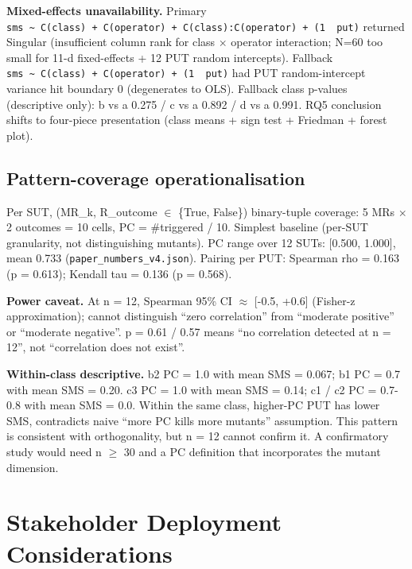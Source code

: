 \documentclass[manuscript,screen,review]{acmart}
\begin{document}
\textbf{Mixed-effects unavailability.} Primary
\texttt{sms\ \textasciitilde{}\ C(class)\ +\ C(operator)\ +\ C(class):C(operator)\ +\ (1\ \textbar{}\ put)}
returned Singular (insufficient column rank for class $\times$ operator
interaction; N=60 too small for 11-d fixed-effects + 12 PUT random
intercepts). Fallback
\texttt{sms\ \textasciitilde{}\ C(class)\ +\ C(operator)\ +\ (1\ \textbar{}\ put)}
had PUT random-intercept variance hit boundary 0 (degenerates to OLS).
Fallback class p-values (descriptive only): b vs a 0.275 / c vs a 0.892
/ d vs a 0.991. RQ5 conclusion shifts to four-piece presentation (class
means + sign test + Friedman + forest plot).

\subsection{Pattern-coverage operationalisation}\label{d.5-pattern-coverage-operationalisation}

Per SUT, (MR\_k, R\_outcome $\in$ \{True, False\}) binary-tuple coverage: 5
MRs $\times$ 2 outcomes = 10 cells, PC = \#triggered / 10. Simplest baseline
(per-SUT granularity, not distinguishing mutants). PC range over 12
SUTs: {[}0.500, 1.000{]}, mean 0.733 (\texttt{paper\_numbers\_v4.json}).
Pairing per PUT: Spearman rho = 0.163 (p = 0.613); Kendall tau = 0.136
(p = 0.568).

\textbf{Power caveat.} At n = 12, Spearman 95\% CI $\approx$ {[}-0.5, +0.6{]}
(Fisher-z approximation); cannot distinguish ``zero correlation'' from ``moderate positive'' or
``moderate negative''. p = 0.61 / 0.57 means ``no correlation detected
at n = 12'', not ``correlation does not exist''.

\textbf{Within-class descriptive.} b2 PC = 1.0 with mean SMS = 0.067; b1
PC = 0.7 with mean SMS = 0.20. c3 PC = 1.0 with mean SMS = 0.14; c1 / c2
PC = 0.7-0.8 with mean SMS = 0.0. Within the same class, higher-PC PUT
has lower SMS, contradicts naive ``more PC kills more mutants''
assumption. This pattern is consistent with orthogonality, but n = 12
cannot confirm it. A confirmatory study would need n $\geq$ 30 and a PC
definition that incorporates the mutant dimension.


\section{Stakeholder Deployment Considerations}\label{e.-stakeholder-deployment-considerations-single-output-kernels-scope}
\end{document}
